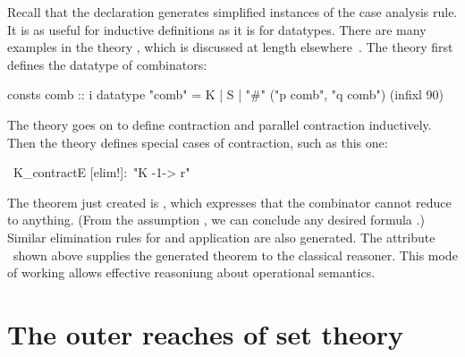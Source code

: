 Recall that the  declaration generates
simplified instances of the case analysis rule.  It is as useful for
inductive definitions as it is for datatypes.  There are many examples
in the theory
, which is discussed at length
elsewhere~\cite{paulson-generic}.  The theory first defines the
datatype
 of combinators:
\begin{ttbox}\isastyleminor
consts comb :: i
datatype  "comb" = K
                 | S
                 | "#" ("p \isasymin comb", "q \isasymin comb")   (infixl 90)
\end{ttbox}
The theory goes on to define contraction and parallel contraction
inductively.  Then the theory  defines special
cases of contraction, such as this one:
\begin{isabelle}
\ K\_contractE [elim!]:\ "K -1-> r"
\end{isabelle}
The theorem just created is ,
which expresses that the combinator  cannot reduce to
anything.  (From the assumption , we can conclude any desired
formula \@.)  Similar elimination rules for  and application are also
generated. The attribute \ shown above supplies the generated
theorem to the classical reasoner.  This mode of working allows
effective reasoniung about operational semantics.

 



\section{The outer reaches of set theory}

